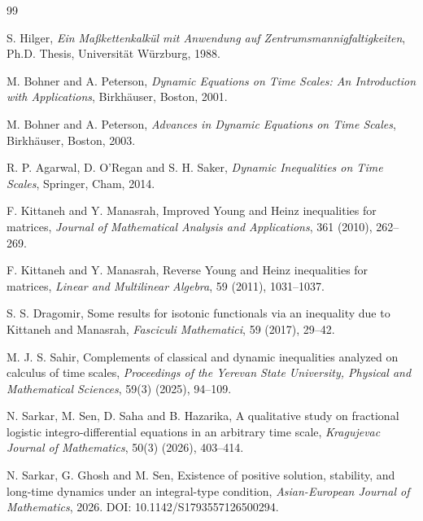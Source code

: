 \documentclass[11pt]{article}
\begin{document}
\begin{thebibliography}{99}

S. Hilger,
\textit{Ein Ma{\ss}kettenkalk\"ul mit Anwendung auf Zentrumsmannigfaltigkeiten},
Ph.D. Thesis, Universit\"at W\"urzburg, 1988.

M. Bohner and A. Peterson,
\textit{Dynamic Equations on Time Scales: An Introduction with Applications},
Birkh\"auser, Boston, 2001.

M. Bohner and A. Peterson,
\textit{Advances in Dynamic Equations on Time Scales},
Birkh\"auser, Boston, 2003.

R. P. Agarwal, D. O'Regan and S. H. Saker,
\textit{Dynamic Inequalities on Time Scales},
Springer, Cham, 2014.

F. Kittaneh and Y. Manasrah,
Improved Young and Heinz inequalities for matrices,
\textit{Journal of Mathematical Analysis and Applications},
361 (2010), 262--269.

F. Kittaneh and Y. Manasrah,
Reverse Young and Heinz inequalities for matrices,
\textit{Linear and Multilinear Algebra},
59 (2011), 1031--1037.

S. S. Dragomir,
Some results for isotonic functionals via an inequality due to Kittaneh and Manasrah,
\textit{Fasciculi Mathematici},
59 (2017), 29--42.

M. J. S. Sahir,
Complements of classical and dynamic inequalities analyzed on calculus of time scales,
\textit{Proceedings of the Yerevan State University, Physical and Mathematical Sciences},
59(3) (2025), 94--109.

N. Sarkar, M. Sen, D. Saha and B. Hazarika,
A qualitative study on fractional logistic integro-differential equations in an arbitrary time scale,
\textit{Kragujevac Journal of Mathematics},
50(3) (2026), 403--414.

N. Sarkar, G. Ghosh and M. Sen,
Existence of positive solution, stability, and long-time dynamics under an integral-type condition,
\textit{Asian-European Journal of Mathematics},
2026.
DOI: 10.1142/S1793557126500294.




\end{thebibliography}
\end{document}
